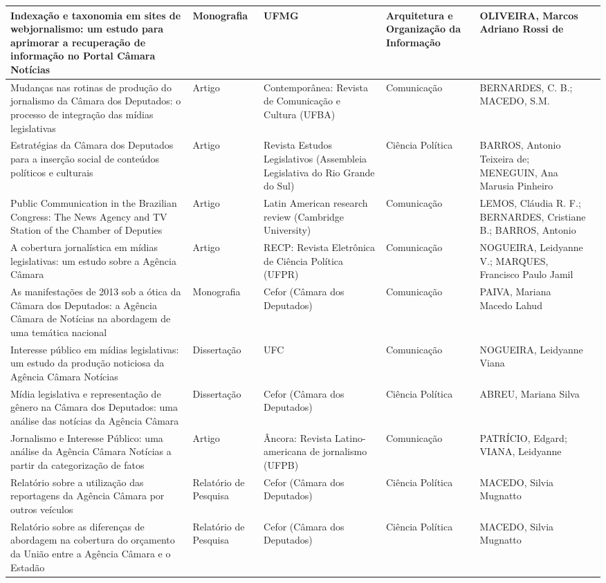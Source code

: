 \begin{longtable}{|m{}|m{}|m{}|m{}|m{}|>{\centering\arraybackslash}p{}|}
Indexação e taxonomia em sites de   webjornalismo: um estudo para aprimorar a recuperação de informação no Portal   Câmara Notícias & Monografia & UFMG & Arquitetura e Organização   da Informação & OLIVEIRA, Marcos Adriano Rossi de & 2013 \\ \hline
Mudanças nas rotinas de produção do   jornalismo da Câmara dos Deputados: o processo de integração das mídias   legislativas & Artigo & Contemporânea: Revista de   Comunicação e Cultura (UFBA) & Comunicação & BERNARDES, C. B.; MACEDO, S.M. & 2014 \\ \hline
Estratégias da Câmara dos Deputados   para a inserção social de conteúdos políticos e culturais & Artigo & Revista Estudos   Legislativos (Assembleia Legislativa do Rio Grande do Sul) & Ciência Política & BARROS, Antonio Teixeira de;   MENEGUIN, Ana Marusia Pinheiro & 2015 \\ \hline
Public Communication in the   Brazilian Congress: The News Agency and TV Station of the Chamber of Deputies & Artigo & Latin American research review   (Cambridge University) & Comunicação & LEMOS, Cláudia R. F.; BERNARDES,   Cristiane B.; BARROS, Antonio & 2016 \\ \hline
A cobertura jornalística em mídias   legislativas: um estudo sobre a Agência Câmara & Artigo & RECP: Revista Eletrônica de   Ciência Política (UFPR) & Comunicação & NOGUEIRA, Leidyanne V.; MARQUES,   Francisco Paulo Jamil & 2016 \\ \hline
As manifestações de 2013 sob a   ótica da Câmara dos Deputados: a Agência Câmara de Notícias na abordagem de   uma temática nacional & Monografia & Cefor (Câmara dos Deputados) & Comunicação & PAIVA, Mariana Macedo Lahud & 2016 \\ \hline
Interesse público em mídias   legislativas: um estudo da produção noticiosa da Agência Câmara Notícias & Dissertação & UFC & Comunicação & NOGUEIRA, Leidyanne Viana & 2017 \\ \hline
Mídia legislativa e representação   de gênero na Câmara dos Deputados: uma análise das notícias da Agência Câmara & Dissertação & Cefor (Câmara dos Deputados) & Ciência Política & ABREU, Mariana Silva & 2017 \\ \hline
Jornalismo   e Interesse Público: uma análise da Agência Câmara Notícias a partir da   categorização de fatos & Artigo & Âncora: Revista   Latino-americana de jornalismo (UFPB) & Comunicação & PATRÍCIO, Edgard; VIANA,   Leidyanne & 2018 \\ \hline
Relatório sobre a utilização das   reportagens da Agência Câmara por outros veículos & Relatório de Pesquisa & Cefor (Câmara dos Deputados) & Ciência Política & MACEDO, Silvia Mugnatto & 2020 \\ \hline
Relatório sobre as diferenças de   abordagem na cobertura do orçamento da União entre a Agência Câmara e o   Estadão & Relatório de Pesquisa & Cefor (Câmara dos Deputados) & Ciência Política & MACEDO, Silvia Mugnatto & 2023 \\ \hline
\end{longtable}
